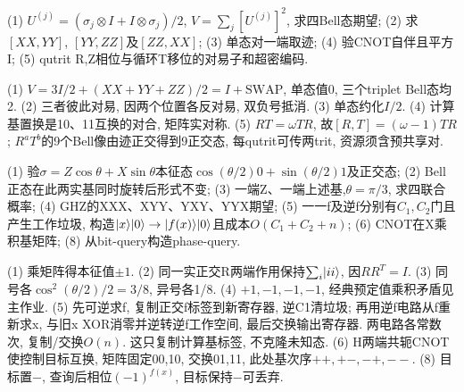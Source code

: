 \begin{exercise}(1) $U^{(j)}=(\sigma_j\otimes I+I\otimes\sigma_j)/2$, $V=\sum_j[U^{(j)}]^2$, 求四Bell态期望; (2) 求$[XX,YY]$, $[YY,ZZ]$及$[ZZ,XX]$; (3) 单态对一端取迹; (4) 验CNOT自伴且平方I; (5) qutrit R,Z相位与循环T移位的对易子和超密编码.\end{exercise}
\begin{solution}(1) $V=3I/2+(XX+YY+ZZ)/2=I+\mathrm{SWAP}$, 单态值0, 三个triplet Bell态均2. (2) 三者彼此对易, 因两个位置各反对易, 双负号抵消. (3) 单态约化$I/2$. (4) 计算基置换是10、11互换的对合, 矩阵实对称. (5) $RT=\omega TR$, 故$[R,T]=(\omega-1)TR$; $R^aT^b$的9个Bell像由迹正交得到9正交态, 每qutrit可传两trit, 资源须含预共享对.
\end{solution}
\begin{exercise}(1) 验$\sigma=Z\cos\theta+X\sin\theta$本征态$\cos(\theta/2)0+\sin(\theta/2)1$及正交态; (2) Bell正态在此两实基同时旋转后形式不变; (3) 一端Z、一端上述基,$\theta=\pi/3$, 求四联合概率; (4) GHZ的XXX、XYY、YXY、YYX期望; (5) 一一f及逆f分别有$C_1,C_2$门且产生工作垃圾, 构造$\lvert x\rangle\lvert 0\rangle\to\lvert f(x)\rangle\lvert 0\rangle$且成本$O(C_1+C_2+n)$; (6) CNOT在X乘积基矩阵; (8) 从bit-query构造phase-query.\end{exercise}
\begin{solution}(1) 乘矩阵得本征值$\pm1$. (2) 同一实正交R两端作用保持$\sum_i\lvert ii\rangle$, 因$RR^T=I$. (3) 同号各$\cos^2(\theta/2)/2=3/8$, 异号各1/8. (4) $+1,-1,-1,-1$, 经典预定值乘积矛盾见主作业. (5) 先可逆求f, 复制正交f标签到新寄存器, 逆C1清垃圾; 再用逆f电路从f重新求x, 与旧x XOR消零并逆转逆f工作空间, 最后交换输出寄存器. 两电路各常数次, 复制/交换$O(n)$. 这只复制计算基标签, 不克隆未知态. (6) H两端共轭CNOT使控制目标互换, 矩阵固定00,10, 交换01,11, 此处基次序$++, +-, -+, --$. (8) 目标置$-$, 查询后相位$(-1)^{f(x)}$, 目标保持$-$可丢弃.
\end{solution}

